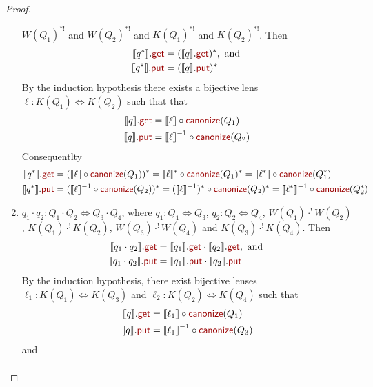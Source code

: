 \documentclass[acmsmall,review,anonymous]{acmart}
\newcommand{\kw}[1]{\textcolor{dkred}{\ensuremath{\mathsf{#1}}}}
\newcommand{\canonize}{\ensuremath{\kw{canonize}}}
\newcommand{\get}{\ensuremath{\kw{get}}}
\newcommand{\lput}{\ensuremath{\kw{put}}}
\begin{document}
\begin{proof}
\begin{enumerate}
$W(Q_1)^{*!}$ and $W(Q_2)^{*!}$ and $K(Q_1)^{*!}$ and $K(Q_2)^{*!}$. Then
\begin{align*}
\llbracket q^* \rrbracket.\get &= (\llbracket q \rrbracket.\get)^*, \text{
and }\\
\llbracket q^* \rrbracket.\lput &= (\llbracket q \rrbracket.\lput)^*
\end{align*}
By the induction hypothesis there exists a bijective lens $\ell : K(Q_1)
\Leftrightarrow K(Q_2)$ such that
that
\begin{align*}
\llbracket q \rrbracket.\get &= \llbracket \ell \rrbracket \circ
\canonize(Q_1)\\
\llbracket q \rrbracket.\lput &= {\llbracket \ell \rrbracket}^{-1} \circ
\canonize(Q_2)
\end{align*}
Consequentlty
\begin{align*}
\llbracket q^* \rrbracket.\get &= (\llbracket \ell \rrbracket \circ
\canonize(Q_1))^* = \llbracket \ell \rrbracket^* \circ
\canonize(Q_1)^* = \llbracket \ell^* \rrbracket \circ
\canonize(Q_1^*)\\
\llbracket q^* \rrbracket.\lput &= (\llbracket \ell \rrbracket^{-1} \circ
\canonize(Q_2))^* = (\llbracket \ell \rrbracket^{-1})^* \circ
\canonize(Q_2)^* = \llbracket \ell^* \rrbracket^{-1} \circ
\canonize(Q_2^*)\\
\end{align*}
\item
$q_1 \cdot q_2: Q_1 \cdot Q_2 \Leftrightarrow Q_3 \cdot Q_4$, where $q_1 : Q_1
\Leftrightarrow Q_3 $,  $q_2 : Q_2 \Leftrightarrow Q_4$, $W(Q_1)
\cdot^! W(Q_2)$, $K(Q_1) \cdot^! K(Q_2)$, $W(Q_3) \cdot^! W(Q_4)$ and $
K(Q_3) \cdot^! K(Q_4)$. Then
\begin{align*}
\llbracket q_1 \cdot q_2 \rrbracket.\get &= \llbracket q_1 \rrbracket.\get \cdot
\llbracket q_2 \rrbracket.\get, \text{ and }\\
\llbracket q_1 \cdot q_2 \rrbracket.\lput &= \llbracket q_1 \rrbracket.\lput
\cdot \llbracket q_2 \rrbracket.\lput
\end{align*}
By the induction hypothesis, there exist bijective lenses $\ell_1 : K(Q_1)
\Leftrightarrow K(Q_3)$ and $\ell_2 : K(Q_2) \Leftrightarrow K(Q_4)$ such that
\begin{align*}
\llbracket q \rrbracket.\get &= \llbracket \ell_1 \rrbracket \circ
\canonize(Q_1)\\
\llbracket q \rrbracket.\lput &= {\llbracket \ell_1 \rrbracket}^{-1} \circ
\canonize(Q_3)
\end{align*}
and
\begin{align*}

\end{align*}
\end{enumerate}
\end{proof}
\end{document}
